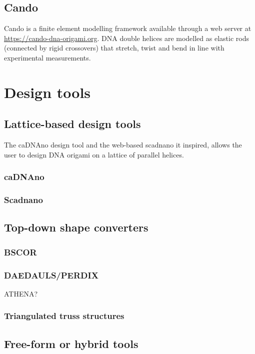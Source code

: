 \subsection{Cando}

Cando is a finite element modelling framework\cite{kim2012cando} available through a web server at \url{https://cando-dna-origami.org}. DNA double helices are modelled as elastic rods (connected by rigid crossovers) that stretch, twist and bend in line with experimental measurements.

\section{Design tools}\label{sec:design_tools}

\subsection{Lattice-based design tools}
The caDNAno design tool and the web-based scadnano\cite{scadnano} it inspired, allows the user to design DNA origami on a lattice of parallel helices.
\subsubsection{caDNAno}
\subsubsection{Scadnano}

\subsection{Top-down shape converters}

\subsubsection{BSCOR}\label{sec:bscor}
\subsubsection{DAEDAULS/PERDIX}
ATHENA? %
\subsubsection{Triangulated truss structures}

\subsection{Free-form or hybrid tools}

